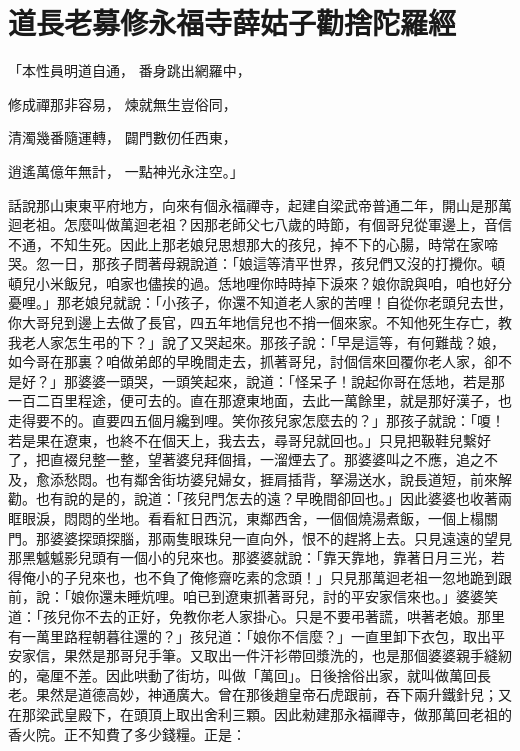 %

\chapter{道長老募修永福寺\KG 薛姑子勸捨陀羅經}

「本性員明道自通，  番身跳出網羅中，

修成禪那非容易，  煉就無生豈俗同，

清濁幾番隨運轉，  闢門數仞任西東，

逍遙萬億年無計，  一點神光永注空。」

話說那山東東平府地方，向來有個永福禪寺，起建自梁武帝普通二年，開山是那萬迴老祖。怎麼叫做萬迴老祖？因那老師父七八歲的時節，有個哥兒從軍邊上，音信不通，不知生死。因此上那老娘兒思想那大的孩兒，掉不下的心腸，時常在家啼哭。忽一日，那孩子問著母親說道：「娘這等清平世界，孩兒們又沒的打攪你。頓頓兒小米飯兒，咱家也儘挨的過。恁地哩你時時掉下淚來？娘你說與咱，咱也好分憂哩。」那老娘兒就說：「小孩子，你還不知道老人家的苦哩！自從你老頭兒去世，你大哥兒到邊上去做了長官，四五年地信兒也不捎一個來家。不知他死生存亡，教我老人家怎生弔的下？」說了又哭起來。那孩子說：「早是這等，有何難哉？娘，如今哥在那裏？咱做弟郎的早晚間走去，抓著哥兒，討個信來回覆你老人家，卻不是好？」那婆婆一頭哭，一頭笑起來，說道：「怪呆子！說起你哥在恁地，若是那一百二百里程途，便可去的。直在那遼東地面，去此一萬餘里，就是那好漢子，也走得要不的。直要四五個月纔到哩。笑你孩兒家怎麼去的？」那孩子就說：「嗄！若是果在遼東，也終不在個天上，我去去，尋哥兒就回也。」只見把靸鞋兒繫好了，把直裰兒整一整，望著婆兒拜個揖，一溜煙去了。那婆婆叫之不應，追之不及，愈添愁悶。也有鄰舍街坊婆兒婦女，捱肩插背，拏湯送水，說長道短，前來解勸。也有說的是的，說道：「孩兒門怎去的遠？早晚間卻回也。」因此婆婆也收著兩眶眼淚，悶悶的坐地。看看紅日西沉，東鄰西舍，一個個燒湯煮飯，一個上榻關門。那婆婆探頭探腦，那兩隻眼珠兒一直向外，恨不的趕將上去。只見遠遠的望見那黑魆魆影兒頭有一個小的兒來也。那婆婆就說：「靠天靠地，靠著日月三光，若得俺小的子兒來也，也不負了俺修齋吃素的念頭！」只見那萬迴老祖一忽地跪到跟前，說：「娘你還未睡炕哩。咱已到遼東抓著哥兒，討的平安家信來也。」婆婆笑道：「孩兒你不去的正好，免教你老人家掛心。只是不要弔著謊，哄著老娘。那里有一萬里路程朝暮往還的？」孩兒道：「娘你不信麼？」一直里卸下衣包，取出平安家信，果然是那哥兒手筆。又取出一件汗衫帶回漿洗的，也是那個婆婆親手縫紉的，毫厘不差。因此哄動了街坊，叫做「萬回」。日後捨俗出家，就叫做萬回長老。果然是道德高妙，神通廣大。曾在那後趙皇帝石虎跟前，吞下兩升鐵針兒；又在那梁武皇殿下，在頭頂上取出舍利三顆。因此勑建那永福禪寺，做那萬回老祖的香火院。正不知費了多少錢糧。正是：

